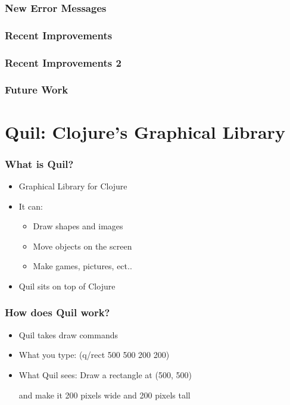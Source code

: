 \documentclass{beamer}
\begin{document}
\begin{frame}
	\frametitle{New Error Messages}
\end{frame}

\begin{frame}
	\frametitle{Recent Improvements}
\end{frame}

\begin{frame}
	\frametitle{Recent Improvements 2}
\end{frame}

\begin{frame}
	\frametitle{Future Work}
\end{frame}




\section{Quil: Clojure's Graphical Library}

\begin{frame}
	\frametitle{What is Quil?}
	\begin{itemize}
  		\item Graphical Library for Clojure
  		\item It can:
  		\begin{itemize}
  	 		\item Draw shapes and images
  	 		\item Move objects on the screen
  	 		\item Make games, pictures, ect..
  		\end{itemize}
  		\item Quil sits on top of Clojure
	 \end{itemize}
\end{frame}

\begin{frame}
	\frametitle{How does Quil work?}
	\begin{itemize}
  		\item Quil takes draw commands
  	 	\item What you type: (q/rect 500 500 200 200)
  	 	\item What Quil sees: Draw a rectangle at (500, 500)\par 
  	 	and make it 200 pixels wide and 200 pixels tall
	 \end{itemize}
\end{frame}
\end{document}
